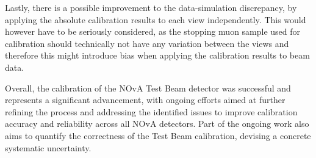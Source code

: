 
Lastly, there is a possible improvement to the data-simulation discrepancy, by applying the absolute calibration results to each view independently. This would however have to be seriously considered, as the stopping muon sample used for calibration should technically not have any variation between the views and therefore this might introduce bias when applying the calibration results to beam data.



Overall, the calibration of the NOvA Test Beam detector was successful and represents a significant advancement, with ongoing efforts aimed at further refining the process and addressing the identified issues to improve calibration accuracy and reliability across all \gls{NOvA} detectors. Part of the ongoing work also aims to quantify the correctness of the Test Beam calibration, devising a concrete systematic uncertainty.



